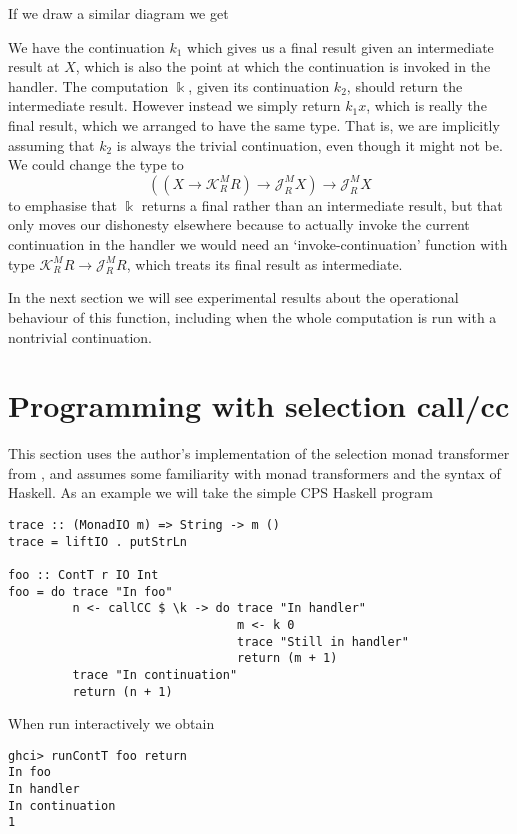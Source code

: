 \documentclass{article}
\newcommand\J{\mathscr J}
\newcommand\K{\mathscr K}
\begin{document}
If we draw a similar diagram we get
\begin{center}\end{center}
We have the continuation $k_1$ which gives us a final result given an intermediate result at $X$, which is also the point at which the continuation is invoked in the handler. The computation $\Bbbk$, given its continuation $k_2$, should return the intermediate result. However instead we simply return $k_1 x$, which is really the final result, which we arranged to have the same type. That is, we are implicitly assuming that $k_2$ is always the trivial continuation, even though it might not be. We could change the type to
\[ ((X \to \K^M_R R) \to \J^M_R X) \to \J^M_R X \]
to emphasise that $\Bbbk$ returns a final rather than an intermediate result, but that only moves our dishonesty elsewhere because to actually invoke the current continuation in the handler we would need an `invoke-continuation' function with type $\K^M_R R \to \J^M_R R$, which treats its final result as intermediate.

In the next section we will see experimental results about the operational behaviour of this function, including when the whole computation is run with a nontrivial continuation.

\section{Programming with selection call/cc}\label{callcc2}


This section uses the author's implementation of the selection monad transformer from \citep{hedges14}, and assumes some familiarity with monad transformers and the syntax of Haskell. As an example we will take the simple CPS Haskell program
\begin{verbatim}
trace :: (MonadIO m) => String -> m ()
trace = liftIO . putStrLn

foo :: ContT r IO Int
foo = do trace "In foo"
         n <- callCC $ \k -> do trace "In handler"
                                m <- k 0
                                trace "Still in handler"
                                return (m + 1)
         trace "In continuation"
         return (n + 1)
\end{verbatim}
When run interactively we obtain
\begin{verbatim}
ghci> runContT foo return
In foo
In handler
In continuation
1
\end{verbatim}
\end{document}
